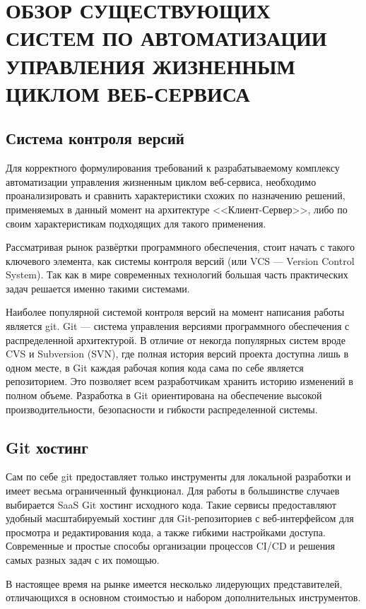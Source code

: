 \chapter{ОБЗОР СУЩЕСТВУЮЩИХ СИСТЕМ ПО АВТОМАТИЗАЦИИ УПРАВЛЕНИЯ ЖИЗНЕННЫМ ЦИКЛОМ ВЕБ-СЕРВИСА}
\label{cha:analysis}

\section{Система контроля версий}

Для корректного формулирования требований к разрабатываемому комплексу автоматизации управления жизненным циклом веб-сервиса,
необходимо проанализировать и сравнить характеристики схожих по назначению решений, применяемых в данный момент на архитектуре <<Клиент-Сервер>>,
либо по своим характеристикам подходящих для такого применения.

Рассматривая рынок развёртки программного обеспечения, стоит начать с такого ключевого элемента, как системы контроля версий (или VCS --- Version Control System).
Так как в мире современных технологий большая часть практических задач решается именно такими системами.

Наиболее популярной системой контроля версий на момент написания работы является git.
Git --- система управления версиями программного обеспечения с распределенной архитектурой.
В отличие от некогда популярных систем вроде CVS и Subversion (SVN),
где полная история версий проекта доступна лишь в одном месте,
в Git каждая рабочая копия кода сама по себе является репозиторием.
Это позволяет всем разработчикам хранить историю изменений в полном объеме.
Разработка в Git ориентирована на обеспечение высокой производительности, безопасности и гибкости распределенной системы.

\section{Git хостинг}

Сам по себе git предоставляет только инструменты для локальной разработки и имеет весьма ограниченный функционал.
Для работы в большинстве случаев выбирается SaaS Git хостинг исходного кода.
Такие сервисы предоставляют удобный масштабируемый хостинг для Git-репозиториев с веб-интерфейсом для просмотра и редактирования кода,
а также гибкими настройками доступа.
Современные и простые способы организации процессов CI/CD и решения самых разных задач с их помощью.

В настоящее время на рынке имеется несколько лидерующих представителей, отличающихся в основном стоимостью и набором дополнительных инструментов.


